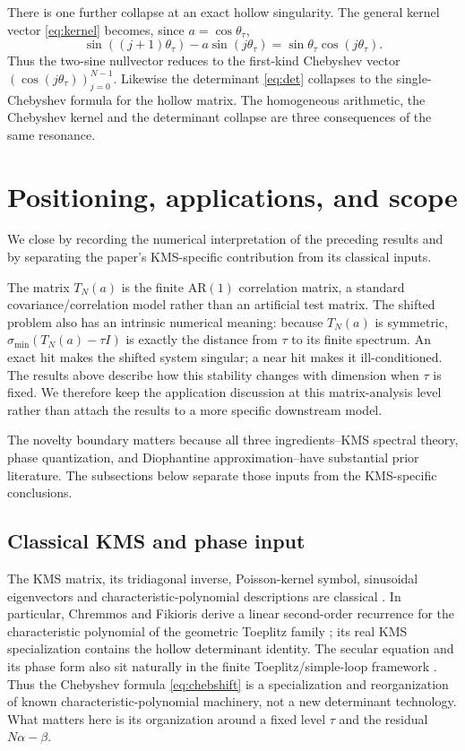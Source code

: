 \documentclass[11pt,reqno]{amsart}
\theoremstyle{plain}
\theoremstyle{definition}
\begin{document}
There is one further collapse at an exact hollow singularity.  The general kernel
vector \eqref{eq:kernel} becomes, since $a=\cos\theta_\tau$,
\[
\sin((j+1)\theta_\tau)-a\sin(j\theta_\tau)
=\sin\theta_\tau\cos(j\theta_\tau).
\]
Thus the two-sine nullvector reduces to the first-kind Chebyshev vector
$(\cos(j\theta_\tau))_{j=0}^{N-1}$.  Likewise the determinant
\eqref{eq:det} collapses to the single-Chebyshev formula for the hollow matrix.
The homogeneous arithmetic, the Chebyshev kernel and the determinant collapse are
three consequences of the same resonance.

\section{Positioning, applications, and scope}\label{sec:scope}

We close by recording the numerical interpretation of the preceding results and by
separating the paper's KMS-specific contribution from its classical inputs.

The matrix $T_N(a)$ is the finite AR$(1)$ correlation matrix, a standard
covariance/correlation model rather than an artificial test matrix.  The shifted
problem also has an intrinsic numerical meaning: because $T_N(a)$ is symmetric,
$\sigma_{\min}(T_N(a)-\tau I)$ is exactly the distance from $\tau$ to its finite
spectrum.  An exact hit makes the shifted system singular; a near hit makes it
ill-conditioned.  The results above describe how this stability changes with
dimension when $\tau$ is fixed.  We therefore keep the application discussion at this matrix-analysis level rather
than attach the results to a more specific downstream model.

The novelty boundary matters because all three ingredients--KMS spectral theory,
phase quantization, and Diophantine approximation--have substantial prior
literature.  The subsections below separate those inputs from the KMS-specific
conclusions.

\subsection*{Classical KMS and phase input}
The KMS matrix, its tridiagonal inverse, Poisson-kernel symbol, sinusoidal
eigenvectors and characteristic-polynomial descriptions are classical
\cite{KMS,GrenanderSzego,ChremmosFikioris2016,Fikioris2018}.  In particular,
Chremmos and Fikioris derive a linear second-order recurrence for the characteristic
polynomial of the geometric Toeplitz family \cite{ChremmosFikioris2016}; its real
KMS specialization contains the hollow determinant identity.  The secular equation
and its phase form also sit naturally in the finite Toeplitz/simple-loop framework
\cite{BBGM2015,BBGM2016}.  Thus the Chebyshev formula \eqref{eq:chebshift} is a
specialization and reorganization of known characteristic-polynomial machinery, not
a new determinant technology.  What matters here is its organization around a fixed
level $\tau$ and the residual $N\alpha-\beta$.
\end{document}

